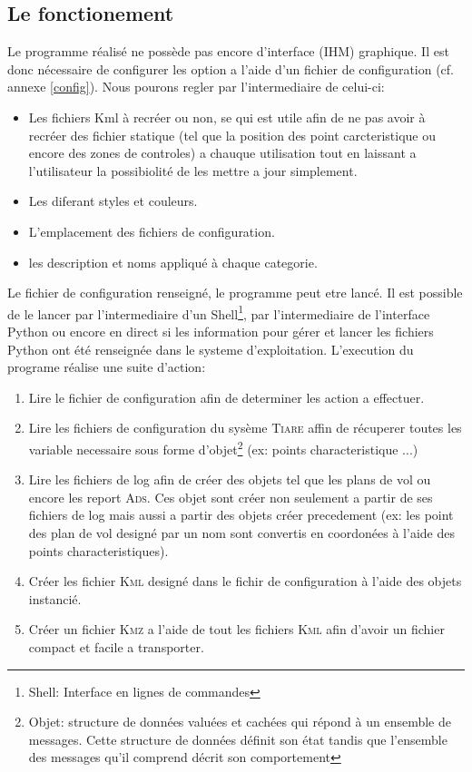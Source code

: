     \subsection{Le fonctionement}
Le programme réalisé ne possède pas encore d'interface (IHM) graphique. Il est donc nécessaire de configurer les option a l'aide d'un fichier de configuration (cf. annexe \vref{config}). Nous pourons regler par l'intermediaire de celui-ci:
\begin{itemize}
    \item Les fichiers Kml à recréer ou non, se qui est utile afin de ne pas avoir à recréer des fichier statique (tel que la position des point carcteristique ou encore des zones de controles) a chauque utilisation tout en laissant a l'utilisateur la possibiolité de les mettre a jour simplement.
    \item Les diferant styles et couleurs.
    \item L'emplacement des fichiers de configuration.
    \item les description et noms appliqué à chaque categorie.
\end{itemize}
Le fichier de configuration renseigné, le programme peut etre lancé. Il est possible de le lancer par l'intermediaire d'un Shell\footnote{Shell: Interface en lignes de commandes}, par l'intermediaire de l'interface Python ou encore en direct si les information pour gérer et lancer les fichiers Python ont été renseignée dans le systeme d'exploitation.
L'execution du programe réalise une suite d'action:
\begin{enumerate}
    \item Lire le fichier de configuration afin de determiner les action a effectuer.
    \item Lire les fichiers de configuration du sysème \textsc{Tiare} affin de récuperer toutes les variable necessaire sous forme d'objet\footnote{Objet: structure de données valuées et cachées qui répond à un ensemble de messages. Cette structure de données définit son état tandis que l'ensemble des messages qu'il comprend décrit son comportement} (ex: points characteristique ...)
    \item Lire les fichiers de log afin de créer des objets tel que les plans de vol ou encore les report \textsc{Ads}. Ces objet sont créer non seulement a partir de ses fichiers de log mais aussi a partir des objets créer precedement (ex: les point des plan de vol designé par un nom sont convertis en coordonées à l'aide des points characteristiques).
    \item Créer les fichier \textsc{Kml} designé dans le fichir de configuration à l'aide des objets instancié.
    \item Créer un fichier \textsc{Kmz} a l'aide de tout les fichiers \textsc{Kml} afin d'avoir un fichier compact et facile a transporter.
\end{enumerate}


